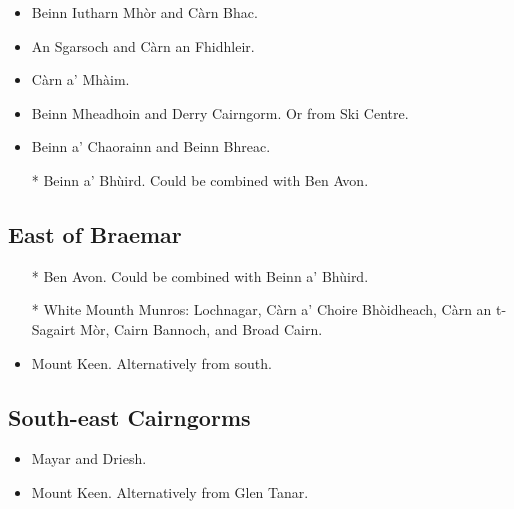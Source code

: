 \begin{itemize}
\item Beinn Iutharn Mhòr and Càrn Bhac.

\item An Sgarsoch and Càrn an Fhidhleir.

\item Càrn a' Mhàim.

\item Beinn Mheadhoin and Derry Cairngorm.  Or from Ski Centre.

\item Beinn a' Chaorainn and Beinn Bhreac.

\item[*] Beinn a' Bhùird.  Could be combined with Ben Avon.
\end{itemize}


\subsection{East of Braemar}

\begin{itemize}
\item[*] Ben Avon.  Could be combined with Beinn a' Bhùird.

\item[*] White Mounth Munros: Lochnagar, Càrn a' Choire Bhòidheach, Càrn an
  t-Sagairt Mòr, Cairn Bannoch, and Broad Cairn.

\item Mount Keen.  Alternatively from south. 
\end{itemize}

\subsection{South-east Cairngorms}

\begin{itemize}
\item Mayar and Driesh.

\item Mount Keen.  Alternatively from Glen Tanar. 
\end{itemize}
